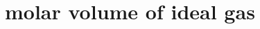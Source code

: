 \hypertarget{group___molar_volume}{}\section{molar volume of ideal gas}
\label{group___molar_volume}
